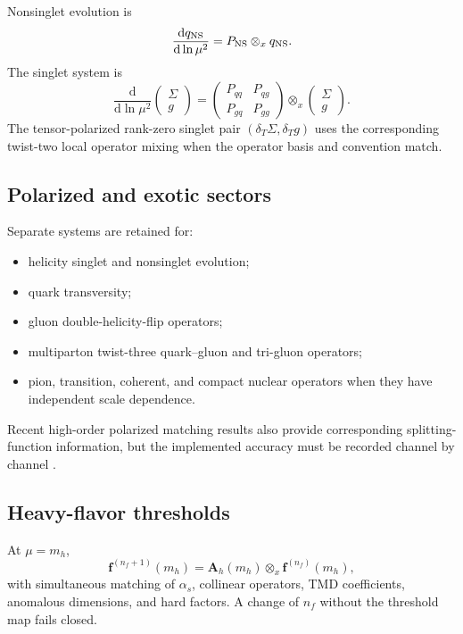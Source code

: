 \documentclass[11pt]{article}
\newcommand{\dd}{\mathrm{d}}
\newcommand{\otimesx}{\mathbin{\otimes_x}}
\begin{document}
Nonsinglet evolution is
\begin{equation}
 \frac{\dd q_{\rm NS}}{\dd\ln\mu^2}
 =
 P_{\rm NS}\otimesx q_{\rm NS}.
 \label{eq:ns-evolution}
\end{equation}
The singlet system is
\begin{equation}
 \frac{\dd}{\dd\ln\mu^2}
 \begin{pmatrix}\Sigma\\g\end{pmatrix}
 =
 \begin{pmatrix}
 P_{qq}&P_{qg}\\
 P_{gq}&P_{gg}
 \end{pmatrix}
 \otimesx
 \begin{pmatrix}\Sigma\\g\end{pmatrix}.
 \label{eq:singlet-evolution}
\end{equation}
The tensor-polarized rank-zero singlet pair \((\delta_T\Sigma,\delta_T g)\) uses the corresponding twist-two local operator mixing when the operator basis and convention match.

\subsection{Polarized and exotic sectors}

Separate systems are retained for:
\begin{itemize}
\item helicity singlet and nonsinglet evolution;
\item quark transversity;
\item gluon double-helicity-flip operators;
\item multiparton twist-three quark--gluon and tri-gluon operators;
\item pion, transition, coherent, and compact nuclear operators when they have independent scale dependence.
\end{itemize}
Recent high-order polarized matching results also provide corresponding splitting-function information, but the implemented accuracy must be recorded channel by channel \cite{ZhuDGLAP2026}.

\subsection{Heavy-flavor thresholds}

At \(\mu=m_h\),
\begin{equation}
 \bm f^{(n_f+1)}(m_h)
 =
 \bm A_h(m_h)
 \otimesx
 \bm f^{(n_f)}(m_h),
 \label{eq:threshold-map}
\end{equation}
with simultaneous matching of \(\alpha_s\), collinear operators, TMD coefficients, anomalous dimensions, and hard factors.  A change of \(n_f\) without the threshold map fails closed.
\end{document}
